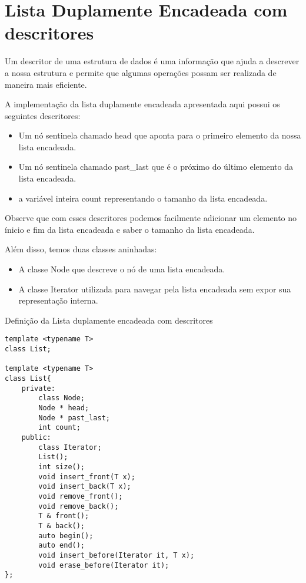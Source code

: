 \section{Lista Duplamente Encadeada com descritores}

Um descritor de uma estrutura de dados é uma informação que ajuda a descrever a nossa estrutura e permite que algumas operações possam ser realizada de maneira mais eficiente.

A implementação da lista duplamente encadeada apresentada aqui possui os seguintes descritores:
\begin{itemize}
    \item Um nó sentinela chamado head que aponta para o primeiro elemento da nossa lista encadeada.
    \item Um nó sentinela chamado past\_last que é o próximo do último elemento da lista encadeada.
    \item a variável inteira count representando o tamanho da lista encadeada.
\end{itemize}

Observe que com esses descritores podemos facilmente adicionar um elemento no ínicio e fim da lista encadeada e saber o tamanho da lista encadeada.

Além disso, temos duas classes aninhadas:

\begin{itemize}
    \item A classe Node que descreve o nó de uma lista encadeada.
    \item A classe Iterator utilizada para navegar pela lista encadeada sem expor sua representação interna.
\end{itemize}



\begin{listing}[!ht]
\caption{Definição da Lista duplamente encadeada com descritores}
\begin{verbatim}
template <typename T> 
class List;

template <typename T> 
class List{
    private:
        class Node;
        Node * head;
        Node * past_last;
        int count;
    public:        
        class Iterator;
        List();
        int size();
        void insert_front(T x);
        void insert_back(T x);
        void remove_front();
        void remove_back();
        T & front();
        T & back();
        auto begin();
        auto end();
        void insert_before(Iterator it, T x);
        void erase_before(Iterator it);
};
\end{verbatim}
\end{listing}


